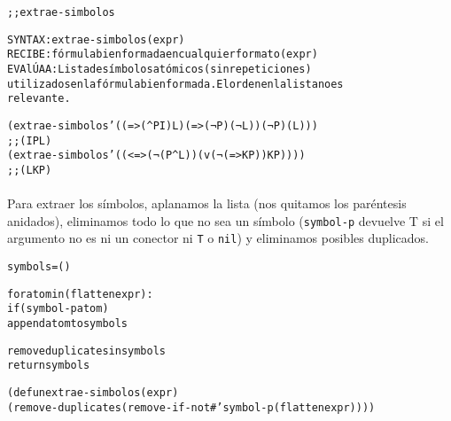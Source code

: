 \begin{aibox}{\function}
\begin{alltt}
;; extrae-simbolos

SYNTAX: extrae-simbolos (expr)
RECIBE : fórmula bien formada en cualquier formato (expr)
EVAlÚA A: Lista de símbolos atómicos (sin repeticiones)
	utilizados en la fórmula bien formada. El orden en la lista no es
	relevante.

\end{alltt}
\end{aibox}

\begin{aibox}{\examples}
\begin{alltt}
(extrae-simbolos '((=> (^ P I) L) (=> (¬ P) (¬ L)) (¬ P) (L)))
;; (I P L)
(extrae-simbolos '((<=> (¬ (P ^ L)) (v (¬ (=> K P)) K P))))
;; (L K P)
\end{alltt}

\end{aibox}

\begin{aibox}{\comments}
\paragraph{}
Para extraer los símbolos, aplanamos la lista (nos quitamos los paréntesis anidados), eliminamos todo lo que no sea un símbolo (\texttt{symbol-p} devuelve T si el argumento no es ni un conector ni \texttt{T} o \texttt{nil}) y eliminamos posibles duplicados.
\end{aibox}

\begin{aibox}{\pseudocode}
\begin{alltt}
symbols = ()

for atom in (flatten expr):
    if (symbol-p atom)
        append atom to symbols

remove duplicates in symbols
return symbols

\end{alltt}
\end{aibox}

\begin{aibox}{\code}

\begin{alltt}

(defun extrae-simbolos (expr)
    (remove-duplicates (remove-if-not #'symbol-p (flatten expr))))

\end{alltt}
\end{aibox}
